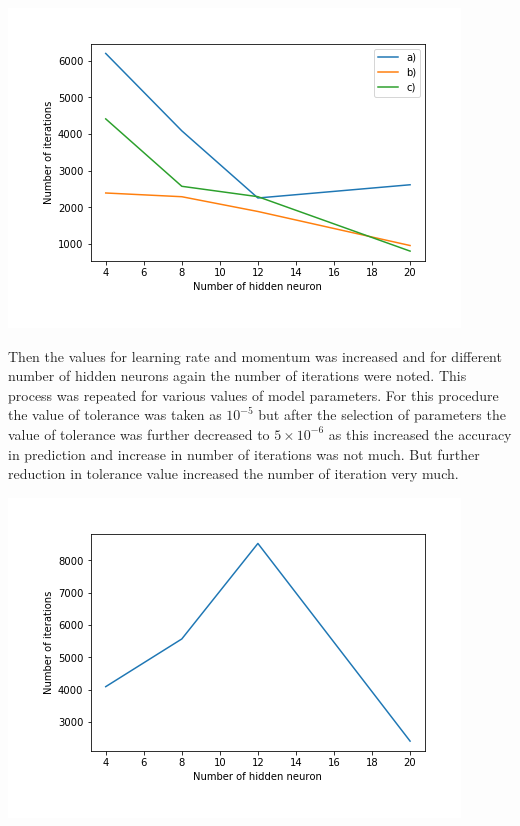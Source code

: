 \begin{center}
	\includegraphics[scale=0.8]{images/iterations/Plot_02.png}
\end{center}
Then the values for learning rate and momentum was increased and for different number of hidden neurons again the number of iterations were noted. This process was repeated for various values of model parameters. For this procedure the value of tolerance was taken as $10^{-5}$ but after the selection of parameters the value of tolerance was further decreased to $5\times10^{-6}$ as this increased the accuracy in prediction and increase in number of iterations was not much. But further reduction in tolerance value increased the number of iteration very much.\\
\begin{center}
	\includegraphics[scale=0.8]{images/iterations/Plot_03.png}
\end{center}
